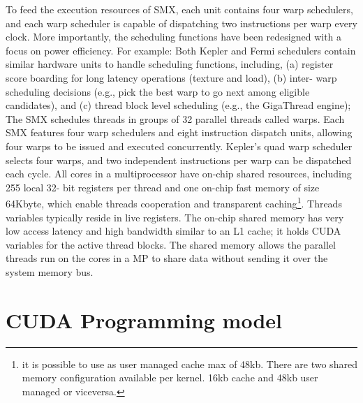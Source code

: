 To feed the execution resources of SMX, each unit contains four warp schedulers, and each warp
scheduler is capable of dispatching two instructions per warp every clock.
More importantly, the scheduling functions have been redesigned with a focus on power efficiency. For
example: Both Kepler and Fermi schedulers contain similar hardware units to handle scheduling
functions, including, (a) register score boarding for long latency operations (texture and load), (b) inter-
warp scheduling decisions (e.g., pick the best warp to go next among eligible candidates), and (c) thread
block level scheduling (e.g., the GigaThread engine);
The SMX schedules threads in groups of 32 parallel threads called warps. Each SMX features four warp 
schedulers and eight instruction dispatch units, allowing four warps to be issued and executed 
concurrently. Kepler's quad warp scheduler selects four warps, and two
independent instructions per warp can be dispatched each cycle. 
All cores in a multiprocessor have on-chip shared resources, including 255 local
32- bit registers per thread and one on-chip fast memory of size 64Kbyte, which
enable threads cooperation and transparent caching\footnote{it is possible to
use as user managed cache max of 48kb. There are two shared memory configuration
available per kernel. 16kb cache and 48kb user managed or viceversa.}.
Threads variables typically reside in live registers. The on-chip shared memory has
very low access latency and high bandwidth similar to an L1 cache; it holds CUDA variables
for the active thread blocks. The shared memory allows the parallel threads run on the cores in
a MP to share data without sending it over the system memory bus.




\FloatBarrier
\newpage
\section{CUDA Programming model}\label{cudaProgrammingModel}

